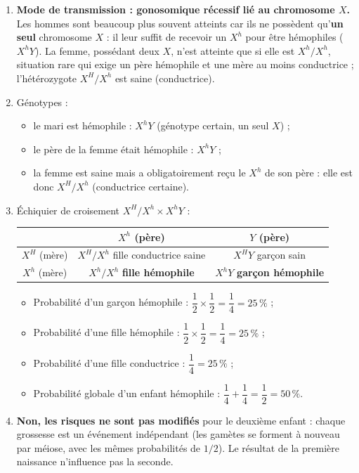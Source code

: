\documentclass[11pt]{article}
\begin{document}
\begin{corrige}
\begin{enumerate}
\item \textbf{Mode de transmission : gonosomique récessif lié au chromosome $X$.} Les hommes sont beaucoup plus souvent atteints car ils ne possèdent qu'\textbf{un seul} chromosome $X$ : il leur suffit de recevoir un $X^{h}$ pour être hémophiles ($X^{h}Y$). La femme, possédant deux $X$, n'est atteinte que si elle est $X^{h}/X^{h}$, situation rare qui exige un père hémophile et une mère au moins conductrice ; l'hétérozygote $X^{H}/X^{h}$ est saine (conductrice).
\item Génotypes :
\begin{itemize}
\item le mari est hémophile : $X^{h}Y$ (génotype certain, un seul $X$) ;
\item le père de la femme était hémophile : $X^{h}Y$ ;
\item la femme est saine mais a obligatoirement reçu le $X^{h}$ de son père : elle est donc $X^{H}/X^{h}$ (conductrice certaine).
\end{itemize}
\item Échiquier de croisement $X^{H}/X^{h} \times X^{h}Y$ :
\begin{center}
\begin{tabular}{|c|c|c|}\hline
\rowcolor{popblueL} & $X^{h}$ (père) & $Y$ (père) \\ \hline
$X^{H}$ (mère) & $X^{H}/X^{h}$ fille conductrice saine & $X^{H}Y$ garçon sain \\ \hline
$X^{h}$ (mère) & $X^{h}/X^{h}$ \textbf{fille hémophile} & $X^{h}Y$ \textbf{garçon hémophile} \\ \hline
\end{tabular}
\end{center}
\begin{itemize}
\item Probabilité d'un garçon hémophile : $\dfrac{1}{2}\times\dfrac{1}{2}=\dfrac{1}{4}=25\,\%$ ;
\item Probabilité d'une fille hémophile : $\dfrac{1}{2}\times\dfrac{1}{2}=\dfrac{1}{4}=25\,\%$ ;
\item Probabilité d'une fille conductrice : $\dfrac{1}{4}=25\,\%$ ;
\item Probabilité globale d'un enfant hémophile : $\dfrac{1}{4}+\dfrac{1}{4}=\dfrac{1}{2}=50\,\%$.
\end{itemize}
\item \textbf{Non, les risques ne sont pas modifiés} pour le deuxième enfant : chaque grossesse est un événement indépendant (les gamètes se forment à nouveau par méiose, avec les mêmes probabilités de $1/2$). Le résultat de la première naissance n'influence pas la seconde.

\end{enumerate}
\end{corrige}
\end{document}

